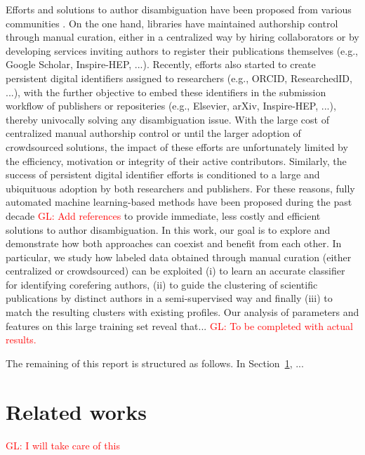 \documentclass{article}
\newcommand{\glnote}[1]{\textcolor{red}{GL: #1}}
\begin{document}
Efforts and solutions to author disambiguation have been proposed from various
communities \citep{liu2014author}. On the one hand, libraries have maintained
authorship control through manual curation, either in a centralized way by
hiring collaborators or by developing services inviting authors to register
their publications themselves (e.g., Google Scholar, Inspire-HEP, ...). Recently,
efforts also started to create persistent digital identifiers assigned to researchers
(e.g., ORCID, ResearchedID, ...), with the further objective to embed these
identifiers in the submission workflow of publishers or repositeries (e.g.,
Elsevier, arXiv, Inspire-HEP, ...), thereby univocally solving any disambiguation
issue. With the large cost of centralized manual authorship control or until
the larger adoption of crowdsourced solutions, the impact of these efforts are
unfortunately limited by the efficiency, motivation or integrity of their
active contributors. Similarly, the success of persistent digital identifier
efforts is conditioned to a large and ubiquituous adoption by both researchers and publishers.
For these reasons, fully automated machine learning-based methods have been
proposed during the past decade \glnote{Add references} to provide immediate, less costly
and efficient solutions to author disambiguation. In this work, our goal
is to explore and demonstrate how both approaches can coexist and benefit from
each other.  In particular, we study how labeled data obtained through manual
curation (either centralized or crowdsourced) can be exploited (i) to learn an
accurate classifier for identifying corefering authors, (ii) to guide the
clustering of scientific publications by distinct authors in a semi-supervised
way and finally (iii) to match the resulting clusters with existing profiles.
Our analysis of parameters and features on this large training set reveal
that... \glnote{To be completed with actual results.}

The remaining of this report is structured as follows. In Section~\ref{related-works}, ...



\section{Related works}
\label{related-works}

\glnote{I will take care of this}

\end{document}
